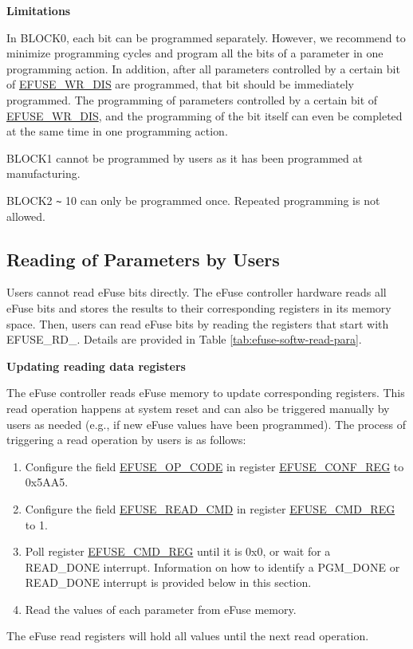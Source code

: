 \documentclass[main\_\_EN.tex]{subfiles}
\begin{document}
{\bfseries Limitations}

In BLOCK0, each bit can be programmed separately. However, we recommend to minimize programming cycles and program all the bits of a parameter in one programming action. In addition, after all parameters controlled by a certain bit of \hyperref[fielddesc:EFUSEWRDIS]{EFUSE\_WR\_DIS} are programmed, that bit should be immediately programmed. The programming of parameters controlled by a certain bit of \hyperref[fielddesc:EFUSEWRDIS]{EFUSE\_WR\_DIS},
and the programming of the bit itself can even be completed at the same time in one programming action.

BLOCK1 cannot be programmed by users as it has been programmed at manufacturing.

BLOCK2 \verb+~+ 10 can only be programmed once. Repeated programming is not allowed.

\subsection{Reading of Parameters by Users}
\label{sec:efuse-software-read-para}

Users cannot read eFuse bits directly. The eFuse controller hardware reads all eFuse bits and stores the results to their corresponding registers in its memory space. Then, users can read eFuse bits by reading the registers that start with EFUSE\_RD\_. Details are provided in Table \ref{tab:efuse-softw-read-para}.



{\bfseries Updating reading data registers}
\label{sec:efuse-update-reg}

The eFuse controller reads eFuse memory to update corresponding registers. This read operation happens at system reset and can also be triggered manually by users as needed (e.g., if new eFuse values have been programmed). The process of triggering a read operation by users is as follows:

\begin{enumerate}
    \item Configure the field \hyperref[fielddesc:EFUSEOPCODE]{EFUSE\_OP\_CODE} in register \hyperref[regdesc:EFUSECONFREG]{EFUSE\_CONF\_REG} to 0x5AA5.
    \item Configure the field \hyperref[fielddesc:EFUSEREADCMD]{EFUSE\_READ\_CMD} in register \hyperref[regdesc:EFUSECMDREG]{EFUSE\_CMD\_REG} to 1.
    \item Poll register \hyperref[regdesc:EFUSECMDREG]{EFUSE\_CMD\_REG} until it is 0x0, or wait for a READ\_DONE interrupt. Information on how to identify a PGM\_DONE or READ\_DONE interrupt is provided below in this section.
    \item Read the values of each parameter from eFuse memory.
\end{enumerate}
The eFuse read registers will hold all values until the next read operation.
\end{document}
